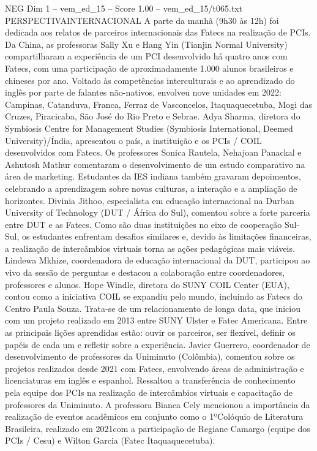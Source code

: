 \begin{textsample}{NEG Dim 1 – vem\_ed\_15 – Score 1.00 – vem\_ed\_15/t065.txt}  \label{ex:f1_neg_039}
PERSPECTIVAINTERNACIONAL A parte da manhã (9h30 às 12h) foi dedicada aos relatos de parceiros internacionais das Fatecs na realização de PCIs.
Da China, as professoras Sally Xu e Hang Yin (Tianjin Normal University) compartilharam a experiência de um PCI desenvolvido há quatro anos com Fatecs, com uma participação de aproximadamente 1.000 alunos brasileiros e chineses por ano.
Voltado às competências interculturais e ao aprendizado do inglês por parte de falantes não-nativos, envolveu nove unidades em 2022: Campinas, Catanduva, Franca, Ferraz de Vasconcelos, Itaquaquecetuba, Mogi das Cruzes, Piracicaba, São José do Rio Preto e Sebrae.
Adya Sharma, diretora do Symbiosis Centre for Management Studies (Symbiosis International, Deemed University)/Índia, apresentou o país, a instituição e os PCIs / COIL desenvolvidos com Fatecs.
Os professores Sonica Rautela, Nehajoan Panackal e Ashutosh Mathur comentaram o desenvolvimento de um estudo comparativo na área de marketing.
Estudantes da IES indiana também gravaram depoimentos, celebrando a aprendizagem sobre novas culturas, a interação e a ampliação de horizontes.
Divinia Jithoo, especialista em educação internacional na Durban University of Technology (DUT / África do Sul), comentou sobre a forte parceria entre DUT e as Fatecs.
Como são duas instituições no eixo de cooperação Sul-Sul, os estudantes enfrentam desafios similares e, devido às limitações financeiras, a realização de intercâmbios virtuais torna as ações pedagógicas mais viáveis.
Lindewa Mkhize, coordenadora de educação internacional da DUT, participou ao vivo da sessão de perguntas e destacou a colaboração entre coordenadores, professores e alunos.
Hope Windle, diretora do SUNY COIL Center (EUA), contou como a iniciativa COIL se expandiu pelo mundo, incluindo as Fatecs do Centro Paula Souza.
Trata-se de um relacionamento de longa data, que iniciou com um projeto realizado em 2013 entre SUNY Ulster e Fatec Americana.
Entre as principais lições aprendidas estão: ouvir os parceiros, ser flexível, definir os papéis de cada um e refletir sobre a experiência.
Javier Guerrero, coordenador de desenvolvimento de professores da Uniminuto (Colômbia), comentou sobre os projetos realizados desde 2021 com Fatecs, envolvendo áreas de administração e licenciaturas em inglês e espanhol.
Ressaltou a transferência de conhecimento pela equipe dos PCIs na realização de intercâmbios virtuais e capacitação de professores da Uniminuto.
A professora Bianca Cely mencionou a importância da realização de eventos acadêmicos em conjunto como o 1ºColóquio de Literatura Brasileira, realizado em 2021com a participação de Regiane Camargo (equipe dos PCIs / Cesu) e Wilton Garcia (Fatec Itaquaquecetuba).

\end{textsample}
